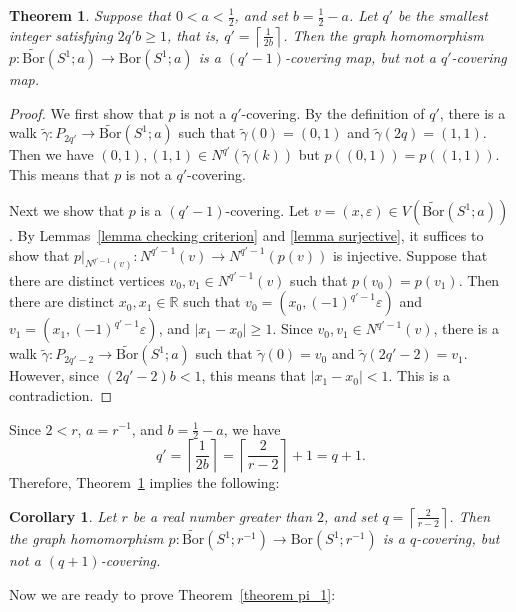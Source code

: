 \documentclass[11pt, amsfonts]{amsart}
\numberwithin{equation}{section}
\newtheorem{theorem}[thm]{Theorem}
\newtheorem{corollary}[thm]{Corollary}
\theoremstyle{definition}
\theoremstyle{remark}
\newcommand{\RR}{\mathbb{R}}
\newcommand{\Bor}{\mathrm{Bor}}
\newcommand{\tBor}{\widetilde{\mathrm{Bor}}}
\newcommand{\tgamma}{\tilde{\gamma}}
\begin{document}
\begin{theorem} \label{theorem pi_1a}
Suppose that $0 < a < \frac{1}{2}$, and set $b = \frac{1}{2} - a$. Let \( q' \) be the smallest integer satisfying \( 2q'b \ge 1 \), that is, \( q' = \left\lceil \frac{1}{2b} \right\rceil \).
Then the graph homomorphism $p \colon \tBor(S^1 ; a) \to \Bor(S^1 ; a)$ is a \((q' - 1)\)-covering map, but not a \(q'\)-covering map.
\end{theorem}
\begin{proof}
We first show that $p$ is not a $q'$-covering. By the definition of $q'$, there is a walk $\tgamma \colon P_{2q'} \to \tBor(S^1; a)$ such that $\tgamma(0) = (0,1)$ and $\tgamma(2q) = (1,1)$. Then we have $(0,1), (1,1) \in N^{q'}(\tgamma(k))$ but $p\left( (0,1) \right) = p\left( (1,1)\right)$. This means that $p$ is not a $q'$-covering.

Next we show that $p$ is a $(q'-1)$-covering. Let $v = (x, \varepsilon) \in V(\tBor(S^1; a))$. By Lemmas~\ref{lemma checking criterion} and \ref{lemma surjective}, it suffices to show that $p |_{N^{q'-1}(v)} \colon N^{q'-1}(v) \to N^{q'-1}(p(v))$ is injective. Suppose that there are distinct vertices $v_0, v_1 \in N^{q'-1}(v)$ such that $p(v_0) = p(v_1)$. Then there are distinct $x_0, x_1 \in \RR$ such that $v_0 = (x_0, (-1)^{q'-1} \varepsilon)$ and $v_1 = (x_1, (-1)^{q'-1} \varepsilon)$, and $|x_1 - x_0| \ge 1$. Since $v_0, v_1 \in N^{q'-1}(v)$, there is a walk $\tgamma \colon P_{2q'-2} \to \tBor(S^1 ; a)$ such that $\tgamma(0) = v_0$ and $\tgamma(2q'-2) = v_1$. However, since $(2q' -2)b < 1$, this means that $|x_1 - x_0| < 1$. This is a contradiction.
\end{proof}

Since $2 < r$, $a = r^{-1}$, and $b = \frac{1}{2} - a$, we have
\[ q' = \left\lceil \frac{1}{2b} \right\rceil = \left\lceil \frac{2}{r - 2} \right\rceil + 1 = q + 1.\]
Therefore, Theorem~\ref{theorem pi_1a} implies the following:

\begin{corollary} \label{corollary covering}
Let $r$ be a real number greater than $2$, and set \( q = \left\lceil \frac{2}{r - 2} \right\rceil \). Then the graph homomorphism $p \colon \tBor(S^1 ; r^{-1}) \to \Bor(S^1 ; r^{-1})$ is a \(q\)-covering, but not a $(q + 1)$-covering.
\end{corollary}

Now we are ready to prove Theorem~\ref{theorem pi_1}:
\end{document}
